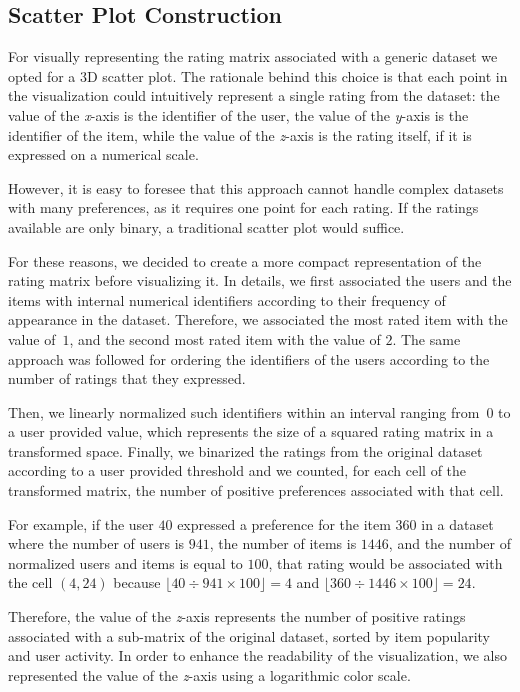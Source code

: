 \subsection{Scatter Plot Construction}
\label{viz:sec:scatter}

For visually representing the rating matrix associated with a generic dataset we opted for a 3D scatter plot. The rationale behind this choice is that each point in the visualization could intuitively represent a single rating from the dataset: the value of the \textit{x}-axis is the identifier of the user, the value of the \textit{y}-axis is the identifier of the item, while the value of the \textit{z}-axis is the rating itself, if it is expressed on a numerical scale.

However, it is easy to foresee that this approach cannot handle complex datasets with many preferences, as it requires one point for each rating. If the ratings available are only binary, a traditional scatter plot would suffice.

For these reasons, we decided to create a more compact representation of the rating matrix before visualizing it. In details, we first associated the users and the items with internal numerical identifiers according to their frequency of appearance in the dataset. Therefore, we associated the most rated item with the value of~$1$, and the second most rated item with the value of $2$. The same approach was followed for ordering the identifiers of the users according to the number of ratings that they expressed.

Then, we linearly normalized such identifiers within an interval ranging from~$0$ to a user provided value, which represents the size of a squared rating matrix in a transformed space. Finally, we binarized the ratings from the original dataset according to a user provided threshold and we counted, for each cell of the transformed matrix, the number of positive preferences associated with that cell.

For example, if the user $40$ expressed a preference for the item $360$ in a dataset where the number of users is $941$, the number of items is $1446$, and the number of normalized users and items is equal to $100$, that rating would be associated with the cell $(4, 24)$ because $\lfloor 40 \div 941 \times 100 \rfloor = 4$ and $\lfloor 360 \div 1446 \times 100 \rfloor = 24$.

Therefore, the value of the \textit{z}-axis represents the number of positive ratings associated with a sub-matrix of the original dataset, sorted by item popularity and user activity. In order to enhance the readability of the visualization, we also represented the value of the \textit{z}-axis using a logarithmic color scale.


